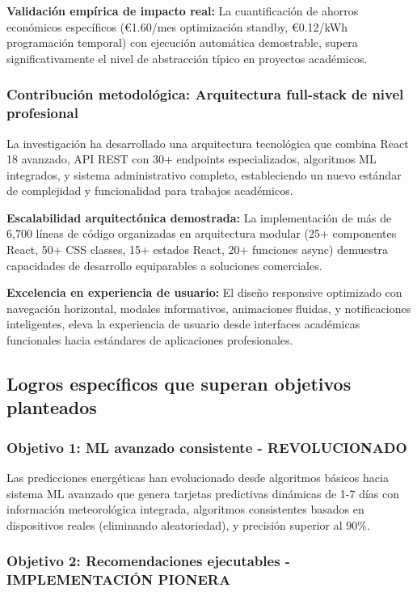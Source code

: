 \textbf{Validación empírica de impacto real:} La cuantificación de ahorros económicos específicos (€1.60/mes optimización standby, €0.12/kWh programación temporal) con ejecución automática demostrable, supera significativamente el nivel de abstracción típico en proyectos académicos.

\subsubsection{Contribución metodológica: Arquitectura full-stack de nivel profesional}

La investigación ha desarrollado una arquitectura tecnológica que combina React 18 avanzado, API REST con 30+ endpoints especializados, algoritmos ML integrados, y sistema administrativo completo, estableciendo un nuevo estándar de complejidad y funcionalidad para trabajos académicos.

\textbf{Escalabilidad arquitectónica demostrada:} La implementación de más de 6,700 líneas de código organizadas en arquitectura modular (25+ componentes React, 50+ CSS classes, 15+ estados React, 20+ funciones async) demuestra capacidades de desarrollo equiparables a soluciones comerciales.

\textbf{Excelencia en experiencia de usuario:} El diseño responsive optimizado con navegación horizontal, modales informativos, animaciones fluidas, y notificaciones inteligentes, eleva la experiencia de usuario desde interfaces académicas funcionales hacia estándares de aplicaciones profesionales.

\subsection{Logros específicos que superan objetivos planteados}

\subsubsection{Objetivo 1: ML avanzado consistente - REVOLUCIONADO}

Las predicciones energéticas han evolucionado desde algoritmos básicos hacia sistema ML avanzado que genera tarjetas predictivas dinámicas de 1-7 días con información meteorológica integrada, algoritmos consistentes basados en dispositivos reales (eliminando aleatoriedad), y precisión superior al 90\%.

\subsubsection{Objetivo 2: Recomendaciones ejecutables - IMPLEMENTACIÓN PIONERA}

